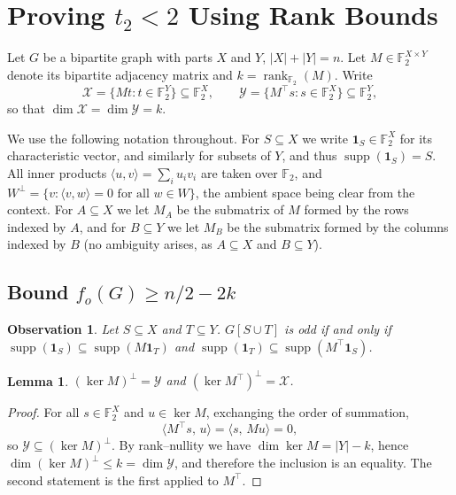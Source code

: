 \documentclass[11pt]{article}
\newtheorem{lemma}[theorem]{Lemma}
\newtheorem{obs}[theorem]{Observation}
\theoremstyle{definition}
\theoremstyle{remark}
\newcommand{\supp}{\operatorname{supp}}
\newcommand{\fo}{f_o}
\newcommand{\1}{\mathbf{1}}
\DeclareMathOperator{\rk}{rank}
\begin{document}
	
	
	\section{Proving $t_2<2$ Using Rank Bounds}\label{sec:k=2}
	Let $G$ be a bipartite graph with parts $X$ and $Y$, $|X|+|Y|=n$. Let $M\in\mathbb{F}_2^{X\times Y}$ denote its bipartite adjacency matrix and $k=\rk_{\mathbb{F}_2}(M)$. Write
	$$
	\mathcal{X}=\{Mt : t\in\mathbb{F}_2^{Y}\}\subseteq\mathbb{F}_2^{X},
	\qquad
	\mathcal{Y}=\{M^{\top}s : s\in\mathbb{F}_2^{X}\}\subseteq\mathbb{F}_2^{Y},
	$$
	so that $\dim\mathcal{X}=\dim\mathcal{Y}=k$.
	
	We use the following notation throughout. For $S\subseteq X$ we write $\mathbf{1}_S\in\mathbb{F}_2^{X}$ for its characteristic vector, and similarly for subsets of $Y$, and thus $\supp(\mathbf{1}_S)=S$. All inner products $\langle u,v\rangle=\sum_i u_iv_i$ are taken over $\mathbb{F}_2$, and $W^{\perp}=\{v:\langle v,w\rangle=0\text{ for all }w\in W\}$, the ambient space being clear from the context. For $A\subseteq X$ we let $M_A$ be the submatrix of $M$ formed by the rows indexed by $A$, and for $B\subseteq Y$ we let $M_B$ be the submatrix formed by the columns indexed by $B$ (no ambiguity arises, as $A\subseteq X$ and $B\subseteq Y$).
	
	\subsection{Bound $\fo(G)\ge n/2-2k$}
	
	\begin{obs}\label{obs:oddpairs}
		Let $S\subseteq X$ and $T\subseteq Y$. $G[S\cup T]$ is odd if and only if
		$\supp(\mathbf{1}_S)\subseteq\supp(M\mathbf{1}_T)$ and
		$\supp(\mathbf{1}_T)\subseteq\supp(M^{\top}\mathbf{1}_S)$.
	\end{obs}
	
	\begin{lemma}\label{lem:duality}
		$(\ker M)^{\perp}=\mathcal{Y}$ and
		$(\ker M^{\top})^{\perp}=\mathcal{X}$.
	\end{lemma}
	
	\begin{proof}
		For all $s\in\mathbb{F}_2^{X}$ and $u\in\ker M$, exchanging the order of
		summation,
		\[
		\langle M^{\top}s,\,u\rangle
		=\langle s,\,Mu\rangle=0,
		\]
		so $\mathcal{Y}\subseteq(\ker M)^{\perp}$. By rank--nullity
		we have $\dim\ker M=|Y|-k$, hence $\dim(\ker M)^{\perp}\leq k=\dim\mathcal{Y}$, and therefore the inclusion is an equality.
		The second statement is the first applied to $M^{\top}$.
	\end{proof}
	
\end{document}
